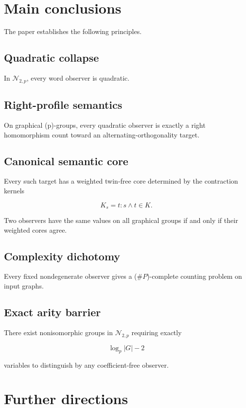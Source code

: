 \documentclass[11pt]{article}
\begin{document}
\section{Main conclusions}

The paper establishes the following principles.

\subsection{Quadratic collapse}

In $\mathcal N_{2,p}$, every word observer is quadratic.

\subsection{Right-profile semantics}

On graphical (p)-groups, every quadratic observer is exactly a right homomorphism count toward an alternating-orthogonality target.

\subsection{Canonical semantic core}

Every such target has a weighted twin-free core determined by the contraction kernels

\[
K_s={t:s\wedge t\in K}.
\]

Two observers have the same values on all graphical groups if and only if their weighted cores agree.

\subsection{Complexity dichotomy}

Every fixed nondegenerate observer gives a ($\#P$)-complete counting problem on input graphs.

\subsection{Exact arity barrier}

There exist nonisomorphic groups in $\mathcal N_{2,p}$ requiring exactly

\[
\log_p|G|-2
\]

variables to distinguish by any coefficient-free observer.

\section{Further directions}
\end{document}
